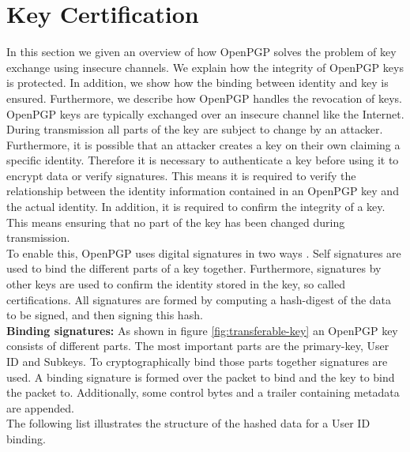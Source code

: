 \section{Key Certification}
\label{section:messageformat:cert}

In this section we given an overview of how OpenPGP solves the problem of key exchange using insecure channels. We explain how the integrity of OpenPGP keys is protected. In addition, we show how the binding between identity and key is ensured. Furthermore, we describe how OpenPGP handles the revocation of keys. \\

OpenPGP keys are typically exchanged over an insecure channel like the Internet. During transmission all parts of the key are subject to change by an attacker. Furthermore, it is possible that an attacker creates a key on their own claiming a specific identity. Therefore it is necessary to authenticate a key before using it to encrypt data or verify signatures.
This means it is required to verify the relationship between the identity information contained in an OpenPGP key and the actual identity. In addition, it is required to confirm the integrity of a key. This means ensuring that no part of the key has been changed during transmission. \\

To enable this, OpenPGP uses digital signatures in two ways \cite[section 5.2.4]{RFC4880}. Self signatures are used to bind the different parts of a key together. Furthermore, signatures by other keys are used to confirm the identity stored in the key, so called certifications. All signatures are formed by computing a hash-digest of the data to be signed, and then signing this hash. \\

\textbf{Binding signatures:} As shown in figure \ref{fig:transferable-key} an OpenPGP key consists of different parts. The most important parts are the primary-key, User ID  and Subkeys. To cryptographically bind those parts together signatures are used. A binding signature is formed over the packet to bind and the key to bind the packet to. Additionally, some control bytes and a trailer containing metadata are appended.  \\

The following list illustrates the structure of the hashed data for a User ID binding.

